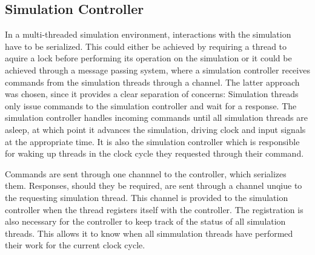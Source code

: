 \subsection{Simulation Controller} %

In a multi-threaded simulation environment, interactions with the simulation have to be serialized. This could either
be achieved by requiring a thread to aquire a lock before performing its operation on the simulation or it could be
achieved through a message passing system, where a simulation controller receives commands from the simulation
threads through a channel. The latter approach was chosen, since it provides a clear separation of concerns:
Simulation threads only issue commands to the simulation controller and wait for a response. The simulation
controller handles incoming commands until all simulation threads are asleep, at which point it advances the
simulation, driving clock and input signals at the appropriate time. It is also the simulation controller which is
responsible for waking up threads in the clock cycle they requested through their  command.

Commands are sent through one channnel to the controller, which serializes them. Responses, should they be required,
are sent through a channel unqiue to the requesting simulation thread. This channel is provided to the simulation
controller when the thread registers itself with the controller. The registration is also necessary for the
controller to keep track of the status of all simulation threads. This allows it to know when all simmulation threads
have performed their work for the current clock cycle.

